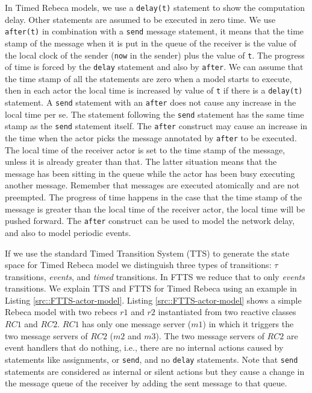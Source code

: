 In Timed Rebeca models, we use a \texttt{delay(t)} statement to show the computation delay. Other statements are assumed to be executed in zero time. We use  \texttt{after(t)} in combination with a \texttt{send} message statement, it means that the time stamp of the message when it is put in the queue of the receiver is the value of the local clock of the sender (\texttt{now} in the sender) plus the value of \texttt{t}.
The progress of time is forced by the \texttt{delay} statement and also by \texttt{after}. 
We can assume that the time stamp of all the statements are zero when a model starts to execute, then in each actor the local time is increased by value of \texttt{t} if there is a \texttt{delay(t)} statement.
A \texttt{send} statement with an  \texttt{after} does not cause any increase in the local time per se. The statement following the \texttt{send} statement has the same time stamp as the \texttt{send} statement itself.
The \texttt{after} construct may cause an increase in the time when the actor picks the message annotated by \texttt{after} to be executed. The local time of the receiver actor is set to the time stamp of the message, unless it is already greater than that.
The latter situation means that the message has been sitting in the queue while the actor has been busy executing another message.
Remember that messages are executed atomically and are not preempted.
%
The progress of time happens in the case that the time stamp of the message is greater than the local time of the receiver actor, the local time will be pushed forward.
%
The \texttt{after} construct can be used to model the network delay, and also to model periodic events.


If we use the standard Timed Transition System (TTS) to generate the state space for Timed Rebeca model we distinguish three types of transitions: $\tau$ transitions, \textit{events}, and \textit{timed} transitions.
In FTTS we reduce that to only \textit{events} transitions.
%
We explain TTS and FTTS for Timed Rebeca using an example in Listing \ref{src::FTTS-actor-model}.
Listing \ref{src::FTTS-actor-model} shows a simple Rebeca model with two rebecs $r1$ and $r2$ instantiated from two reactive classes $RC1$ and $RC2$.
$RC1$ has only one message server ($m1$) in which it triggers the two message servers of $RC2$ ($m2$ and $m3$).
The two message servers of $RC2$ are event handlers that do nothing, i.e., there are no internal actions caused by statements like assignments, or \texttt{send}, and no  \texttt{delay} statements. Note that \texttt{send} statements are considered as internal or silent actions but they cause a change in the message queue of the receiver by adding the sent message to that queue.
 

